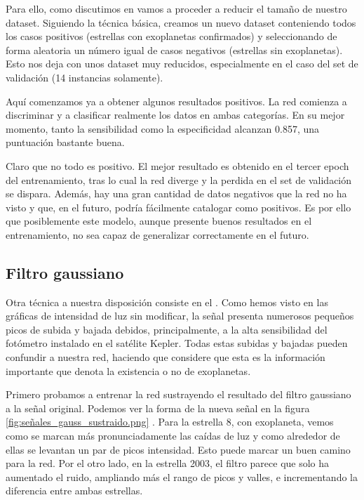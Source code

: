 Para ello, como discutimos en  vamos a proceder a reducir el tamaño de nuestro dataset. Siguiendo la técnica básica, creamos un nuevo dataset conteniendo todos los casos positivos (estrellas con exoplanetas confirmados) y seleccionando de forma aleatoria un número igual de casos negativos (estrellas sin exoplanetas). Esto nos deja con unos dataset muy reducidos, especialmente en el caso del set de validación (14 instancias solamente).

Aquí comenzamos ya a obtener algunos resultados positivos. La red comienza a discriminar y a clasificar realmente los datos en ambas categorías. En su mejor momento, tanto la sensibilidad como la especificidad alcanzan 0.857, una puntuación bastante buena. 

Claro que no todo es positivo. El mejor resultado es obtenido en el tercer epoch del entrenamiento, tras lo cual la red diverge y la perdida en el set de validación se dispara. Además, hay una gran cantidad de datos negativos que la red no ha visto y que, en el futuro, podría fácilmente catalogar como positivos. Es por ello que posiblemente este modelo, aunque presente buenos resultados en el entrenamiento, no sea capaz de generalizar correctamente en el futuro.

\subsection{Filtro gaussiano}

Otra técnica a nuestra disposición consiste en el . Como hemos visto en las gráficas de intensidad de luz sin modificar, la señal presenta numerosos pequeños picos de subida y bajada debidos, principalmente, a la alta sensibilidad del fotómetro instalado en el satélite Kepler. Todas estas subidas y bajadas pueden confundir a nuestra red, haciendo que considere que esta es la información importante que denota la existencia o no de exoplanetas.

Primero probamos a entrenar la red sustrayendo el resultado del filtro gaussiano a la señal original. Podemos ver la forma de la nueva señal en la figura \ref{fig:señales_gauss_sustraido.png} . Para la estrella 8, con exoplaneta, vemos como se marcan más pronunciadamente las caídas de luz y como alrededor de ellas se levantan un par de picos intensidad. Esto puede marcar un buen camino para la red. Por el otro lado, en la estrella 2003, el filtro parece que solo ha aumentado el ruido, ampliando más el rango de picos y valles, e incrementando la diferencia entre ambas estrellas.

